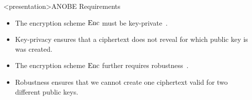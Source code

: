 \begin{frame}
  \begin{figure}
    \begin{algorithmic}[1]

        \pause{}

        \EndFor{}

        \pause{}

      \EndFunction{}
    \end{algorithmic}
  \end{figure}
\end{frame}

\begin{frame}<presentation>{ANOBE Requirements}
  \begin{itemize}
    \item The encryption scheme \(\operatorname{\mathrm{Enc}}\) must be key-private~\cite{KeyPrivacy}.

    \item Key-privacy ensures that a ciphertext does not reveal for which 
      public key is was created.

      \pause{}

    \item The encryption scheme \(\operatorname{\mathrm{Enc}}\) further requires 
      robustness~\cite{RobustEncryption}.

    \item Robustness ensures that we cannot create one ciphertext valid for two 
      different public keys.
  \end{itemize}
\end{frame}

